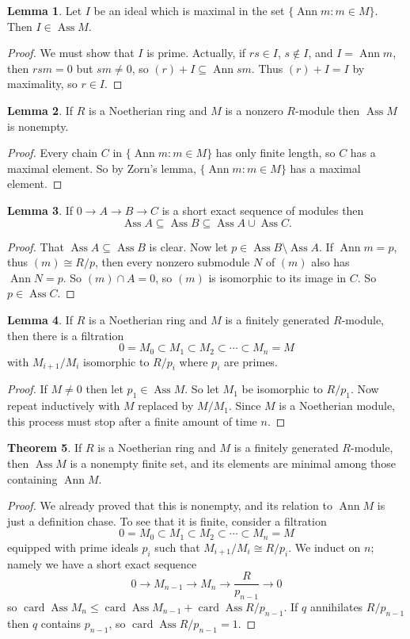 \documentclass[12pt]{book}
\DeclareMathOperator{\Ann}{Ann}
\DeclareMathOperator{\Ass}{Ass}
\DeclareMathOperator{\card}{card}
\theoremstyle{definition}
\newtheorem{theorem}{Theorem}[chapter]
\newtheorem{lemma}[theorem]{Lemma}
\begin{document}
\begin{lemma}
Let $I$ be an ideal which is maximal in the set $\{\Ann m: m \in M\}$.
Then $I \in \Ass M$.
\end{lemma}
\begin{proof}
We must show that $I$ is prime.
Actually, if $rs \in I$, $s \notin I$, and $I = \Ann m$, then $rsm = 0$ but $sm \neq 0$, so $(r) + I \subseteq \Ann sm$.
Thus $(r) + I = I$ by maximality, so $r \in I$.
\end{proof}

\begin{lemma}
If $R$ is a Noetherian ring and $M$ is a nonzero $R$-module then $\Ass M$ is nonempty.
\end{lemma}
\begin{proof}
Every chain $C$ in $\{\Ann m: m \in M\}$ has only finite length, so $C$ has a maximal element.
So by Zorn's lemma, $\{\Ann m: m \in M\}$ has a maximal element.
\end{proof}

\begin{lemma}
If $0 \to A \to B \to C$ is a short exact sequence of modules then
$$\Ass A \subseteq \Ass B \subseteq \Ass A \cup \Ass C.$$
\end{lemma}
\begin{proof}
That $\Ass A \subseteq \Ass B$ is clear.
Now let $p \in \Ass B \setminus \Ass A$.
If $\Ann m = p$, thus $(m) \cong R/p$, then every nonzero submodule $N$ of $(m)$ also has $\Ann N = p$.
So $(m) \cap A = 0$, so $(m)$ is isomorphic to its image in $C$.
So $p \in \Ass C$.
\end{proof}

\begin{lemma}
If $R$ is a Noetherian ring and $M$ is a finitely generated $R$-module, then there is a filtration
$$0 = M_0 \subset M_1 \subset M_2 \subset \cdots \subset M_n = M$$
with $M_{i+1}/M_i$ isomorphic to $R/p_i$ where $p_i$ are primes.
\end{lemma}
\begin{proof}
If $M \neq 0$ then let $p_1 \in \Ass M$.
So let $M_1$ be isomorphic to $R/p_1$.
Now repeat inductively with $M$ replaced by $M/M_1$.
Since $M$ is a Noetherian module, this process must stop after a finite amount of time $n$.
\end{proof}

\begin{theorem}
If $R$ is a Noetherian ring and $M$ is a finitely generated $R$-module, then $\Ass M$ is a nonempty finite set, and its elements are minimal among those containing $\Ann M$.
\end{theorem}
\begin{proof}
We already proved that this is nonempty, and its relation to $\Ann M$ is just a definition chase.
To see that it is finite, consider a filtration
$$0 = M_0 \subset M_1 \subset M_2 \subset \cdots \subset M_n = M$$
equipped with prime ideals $p_i$ such that $M_{i+1}/M_i \cong R/p_i$.
We induct on $n$; namely we have a short exact sequence
$$0 \to M_{n - 1} \to M_n \to \frac{R}{p_{n - 1}} \to 0$$
so $\card \Ass M_n \leq \card \Ass M_{n - 1} + \card \Ass R/p_{n - 1}$.
If $q$ annihilates $R/p_{n - 1}$ then $q$ contains $p_{n - 1}$, so $\card \Ass R/p_{n - 1} = 1$.
\end{proof}
\end{document}
